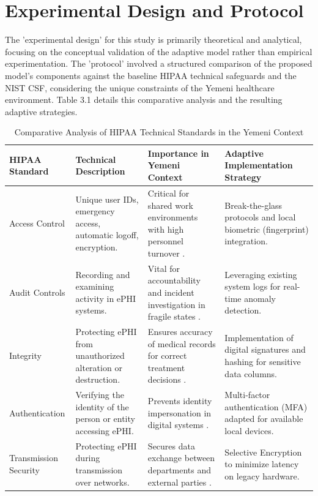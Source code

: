 \documentclass[12pt, a4paper, oneside]{report}
\begin{document}
	\section{Experimental Design and Protocol}
	The 'experimental design' for this study is primarily theoretical and analytical, focusing on the conceptual validation of the adaptive model rather than empirical experimentation. The 'protocol' involved a structured comparison of the proposed model's components against the baseline HIPAA technical safeguards and the NIST CSF, considering the unique constraints of the Yemeni healthcare environment. Table 3.1 details this comparative analysis and the resulting adaptive strategies.
	
	
	
	
	\begin{table}[H]
		\centering
		\caption{Comparative Analysis of HIPAA Technical Standards in the Yemeni Context}
		\label{tab:metrics}
		\begin{tabularx}{\textwidth}{lXXX}
			\toprule
			\textbf{HIPAA Standard} & \textbf{Technical Description} & \textbf{Importance in Yemeni Context} & \textbf{Adaptive Implementation Strategy} \\
			\midrule
			Access Control & Unique user IDs, emergency access, automatic logoff, encryption. & Critical for shared work environments with high personnel turnover \cite{abdulrab2021assessing}.&
			Break-the-glass protocols and local biometric (fingerprint) integration. \\
			Audit Controls & Recording and examining activity in ePHI systems. & Vital for accountability and incident investigation in fragile states \cite{al2023information}. &
			Leveraging existing system logs for real-time anomaly detection. \\
			Integrity &
			Protecting ePHI from unauthorized alteration or destruction.&
			Ensures accuracy of medical records for correct treatment decisions \cite{nist2024sp80066r2}. &
			Implementation of digital signatures and hashing for sensitive data columns. \\
			Authentication &
			Verifying the identity of the person or entity accessing ePHI. &
			Prevents identity impersonation in digital systems \cite{hasegawa2024cybersecurity}. &
			Multi-factor authentication (MFA) adapted for available local devices. \\
			Transmission Security &
			Protecting ePHI during transmission over networks. &
			Secures data exchange between departments and external parties \cite{saad2025fuzzy}. &
			Selective Encryption to minimize latency on legacy hardware. \\
			\bottomrule
		\end{tabularx}
	\end{table}
	
\end{document}
